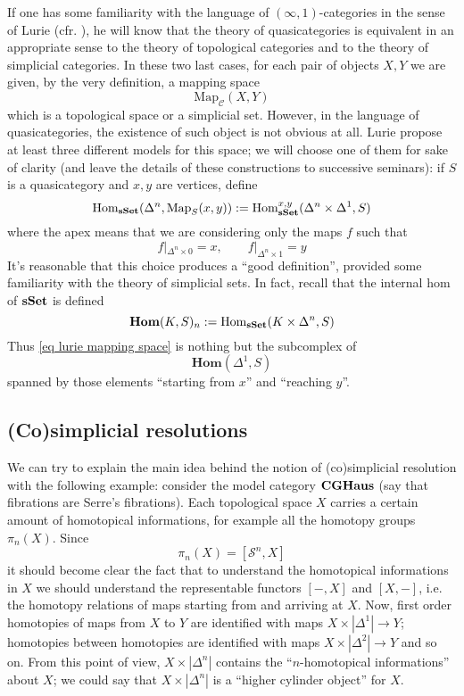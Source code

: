 \begin{refsection}
If one has some familiarity with the language of $(\infty,1)$-categories in the sense of Lurie (cfr. \cite{htt}), he will know that the theory of quasicategories is equivalent in an appropriate sense to the theory of topological categories and to the theory of simplicial categories. In these two last cases, for each pair of objects $X,Y$ we are given, by the very definition, a mapping space
\[
\mathrm{Map}_{\mathcal C}(X,Y)
\]
which is a topological space or a simplicial set. However, in the language of quasicategories, the existence of such object is not obvious at all. Lurie propose at least three different models for this space; we will choose one of them for sake of clarity (and leave the details of these constructions to successive seminars): if $S$ is a quasicategory and $x,y$ are vertices, define
\begin{equation} \label{eq lurie mapping space}
\mathrm{Hom}_{\mathbf{sSet}}(\Delta^n, \mathrm{Map}_S(x,y)) := \mathrm{Hom}_{\mathbf{sSet}}^{x,y}(\Delta^n \times \Delta^1, S)
\end{equation}
where the apex means that we are considering only the maps $f$ such that
\[
f |_{\Delta^n \times 0} = x, \qquad f |_{\Delta^n \times 1} = y
\]
It's reasonable that this choice produces a ``good definition'', provided some familiarity with the theory of simplicial sets. In fact, recall that the internal hom of $\mathbf{sSet}$ is defined
\[
\mathbf{Hom}(K,S)_n := \mathrm{Hom}_{\mathbf{sSet}}(K \times \Delta^n, S)
\]
Thus \eqref{eq lurie mapping space} is nothing but the subcomplex of
\[
\mathbf{Hom}(\Delta^1,S)
\]
spanned by those elements ``starting from $x$'' and ``reaching $y$''.

\subsection{(Co)simplicial resolutions} \label{cosimplicial resolutions}

We can try to explain the main idea behind the notion of (co)simplicial resolution with the following example: consider the model category $\mathbf{CGHaus}$ (say that fibrations are Serre's fibrations). Each topological space $X$ carries a certain amount of homotopical informations, for example all the homotopy groups $\pi_n(X)$. Since
\[
\pi_n(X) = [\mathcal S^n, X]
\]
it should become clear the fact that to understand the homotopical informations in $X$ we should understand the representable functors $[-,X]$ and $[X,-]$, i.e. the homotopy relations of maps starting from and arriving at $X$. Now, first order homotopies of maps from $X$ to $Y$ are identified with maps $X \times |\Delta^1| \to Y$; homotopies between homotopies are identified with maps $X \times |\Delta^2| \to Y$ and so on. From this point of view, $X \times |\Delta^n|$ contains the ``$n$-homotopical informations'' about $X$; we could say that $X \times |\Delta^n|$ is a ``higher cylinder object'' for $X$.


\end{refsection}
